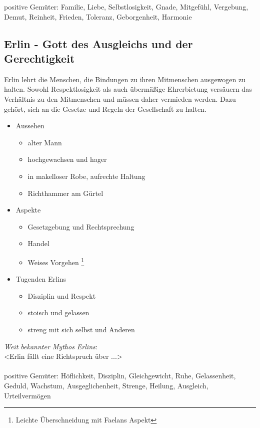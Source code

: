 positive Gemüter: Familie, Liebe, Selbstlosigkeit, Gnade, Mitgefühl, Vergebung, Demut, Reinheit, Frieden, Toleranz, Geborgenheit, Harmonie

\subsection{\textbf{Erlin} - Gott des Ausgleichs und der Gerechtigkeit}
Erlin lehrt die Menschen, die Bindungen zu ihren Mitmenschen ausgewogen zu halten. Sowohl Respektlosigkeit als auch übermäßige Ehrerbietung versäuern das Verhältnis 
zu den Mitmenschen und müssen daher vermieden werden. Dazu gehört, sich an die Gesetze und Regeln der Gesellschaft zu halten.\\
\begin{itemize}
	\item Aussehen 
	\begin{itemize}
		\item alter Mann 
		\item hochgewachsen und hager
		\item in makelloser Robe, aufrechte Haltung
		\item Richthammer am Gürtel
	\end{itemize}
	\item Aspekte
	\begin{itemize}
		\item Gesetzgebung und Rechtsprechung
		\item Handel
		\item Weises Vorgehen \footnote{Leichte Überschneidung mit Faelans Aspekt}
	\end{itemize}
	\item Tugenden Erlins
	\begin{itemize}
		\item Disziplin und Respekt
		\item stoisch und gelassen
		\item streng mit sich selbst und Anderen
	\end{itemize}
\end{itemize}
\textit{Weit bekannter Mythos Erlins}:\\
<Erlin fällt eine Richtspruch über ...>\\~\\
positive Gemüter: Höflichkeit, Disziplin, Gleichgewicht, Ruhe, Gelassenheit, Geduld, Wachstum, Ausgeglichenheit, Strenge, Heilung, Ausgleich, Urteilvermögen

